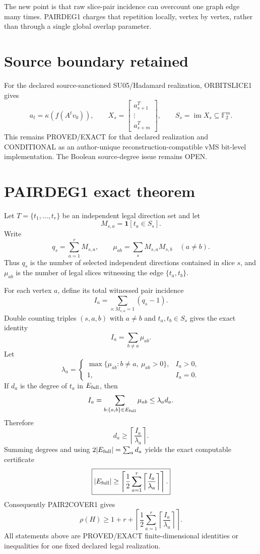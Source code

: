 \documentclass[11pt]{article}
\begin{document}
The new point is that raw slice-pair incidence can overcount one graph edge many times. PAIRDEG1 charges that repetition locally, vertex by vertex, rather than through a single global overlap parameter.

\section*{Source boundary retained}
For the declared source-sanctioned SU05/Hadamard realization, ORBITSLICE1 gives
\[
a_t=\kappa(f(A^tv_0)),\qquad
X_s=
\begin{bmatrix}
a_{s+1}^{T}\\ \vdots\\ a_{s+m}^{T}
\end{bmatrix},\qquad
S_s=\operatorname{im}X_s\subseteq\mathbb F_2^m.
\]
This remains PROVED/EXACT for that declared realization and CONDITIONAL as an author-unique reconstruction-compatible vMS bit-level implementation. The Boolean source-degree issue remains OPEN.

\section*{PAIRDEG1 exact theorem}
Let \(T=\{t_1,\ldots,t_r\}\) be an independent legal direction set and let
\[
M_{s,a}=\mathbf 1[t_a\in S_s].
\]
Write
\[
q_s=\sum_{a=1}^r M_{s,a},
\qquad
\mu_{ab}=\sum_s M_{s,a}M_{s,b}\quad(a\ne b).
\]
Thus \(q_s\) is the number of selected independent directions contained in slice \(s\), and \(\mu_{ab}\) is the number of legal slices witnessing the edge \(\{t_a,t_b\}\).

For each vertex \(a\), define its total witnessed pair incidence
\[
I_a=\sum_{s:M_{s,a}=1}(q_s-1).
\]
Double counting triples \((s,a,b)\) with \(a\ne b\) and \(t_a,t_b\in S_s\) gives the exact identity
\[
\boxed{
I_a=\sum_{b\ne a}\mu_{ab}.
}
\]
Let
\[
\lambda_a=
\begin{cases}
\max\{\mu_{ab}:b\ne a,\ \mu_{ab}>0\},& I_a>0,\\
1,& I_a=0.
\end{cases}
\]
If \(d_a\) is the degree of \(t_a\) in \(E_{\rm full}\), then
\[
I_a=\sum_{b:\{a,b\}\in E_{\rm full}}\mu_{ab}
\le \lambda_a d_a.
\]
Therefore
\[
\boxed{
d_a\ge \left\lceil\frac{I_a}{\lambda_a}\right\rceil.
}
\]
Summing degrees and using \(2|E_{\rm full}|=\sum_a d_a\) yields the exact computable certificate
\[
\boxed{
|E_{\rm full}|
\ge
\left\lceil
\frac12\sum_{a=1}^r
\left\lceil\frac{I_a}{\lambda_a}\right\rceil
\right\rceil.
}
\]
Consequently PAIR2COVER1 gives
\[
\boxed{
\rho(H)\ge
1+r+
\left\lceil
\frac12\sum_{a=1}^r
\left\lceil\frac{I_a}{\lambda_a}\right\rceil
\right\rceil.
}
\]
All statements above are PROVED/EXACT finite-dimensional identities or inequalities for one fixed declared legal realization.
\end{document}
